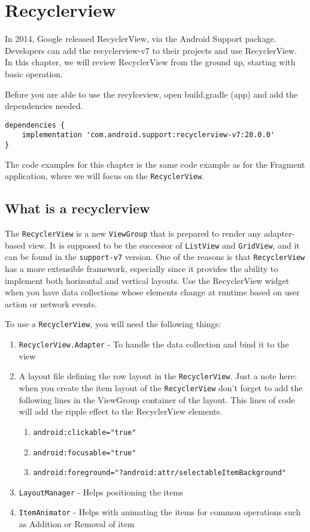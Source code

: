 \chapter{Recyclerview}
In 2014, Google released RecyclerView, via the Android Support package.
Developers can add the recyclerview-v7 to their projects and use RecyclerView.
In this chapter, we will review RecyclerView from the ground up, starting with basic
operation.

Before you are able to use the recylceview,  open build.gradle (app) and add the dependencies needed.


\begin{lstlisting}
dependencies {
	implementation 'com.android.support:recyclerview-v7:28.0.0'
}
\end{lstlisting}


\begin{example}
	The code examples for this chapter is the same code example as for the Fragment application, where we will focus on the  \lstinline!RecyclerView!.
\end{example}

\section{What is a recyclerview}
The \lstinline!RecyclerView! is a new \lstinline!ViewGroup! that is prepared to render any adapter-based view.
It is supposed to be the successor of \lstinline!ListView! and \lstinline!GridView!, and it can be found in the \lstinline!support-v7! version.
One of the reasons is that \lstinline!RecyclerView! has a more extensible framework, especially since it provides the ability to implement both horizontal and vertical layouts.
Use the RecyclerView widget when you have data collections whose elements change at runtime based on user action or network events.

To use a \lstinline!RecyclerView!, you will need the following things:
\begin{enumerate}
	\item \lstinline!RecyclerView.Adapter! - To handle the data collection and bind it to the view
	\item A layout file defining the row layout in the \lstinline!RecyclerView!.
Just a note here: when you create the item layout of the \lstinline!RecyclerView! don’t forget to add the following lines in the ViewGroup container of the layout.
This lines of code will add the ripple effect to the RecyclerView elements.
	\begin{enumerate}
		\item  \lstinline!android:clickable="true"!
		\item \lstinline!android:focusable="true"!
		\item \lstinline!android:foreground="?android:attr/selectableItemBackground"!
	\end{enumerate}
	\item \lstinline!LayoutManager! - Helps positioning the items
	\item \lstinline!ItemAnimator! - Helps with animating the items for common operations such as Addition or Removal of item
\end{enumerate}


